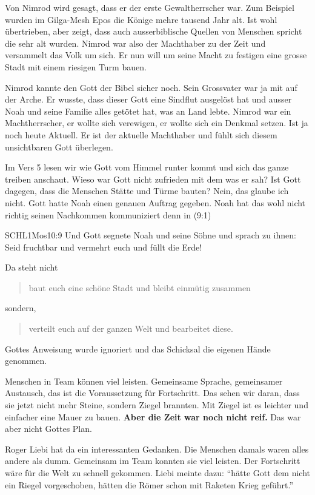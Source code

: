 \documentclass[14pt]{../../inc/mybib}
\newcommand{\q}[1]{\blockquote{#1}}
\newenvironment{block}[1][]{%
  \vspace{1.5em}%
  \noindent\textbf{#1}\par%
  \vspace{0.0em}%
}{%
  \vspace{1em}%
}
\begin{document}
\begin{block}
    Von Nimrod wird gesagt, dass er der erste Gewaltherrscher war. Zum Beispiel wurden im Gilga-Mesh Epos die Könige mehre tausend Jahr alt. Ist wohl übertrieben, aber zeigt, dass auch ausserbiblische Quellen von Menschen spricht die sehr alt wurden. Nimrod war also der Machthaber zu der Zeit und versammelt das Volk um sich. Er nun will um seine Macht zu festigen eine grosse Stadt mit einem riesigen Turm bauen.
\end{block}
\begin{block}
    Nimrod kannte den Gott der Bibel sicher noch. Sein Grossvater war ja mit auf der Arche. Er wusste, dass dieser Gott eine Sindflut ausgelöst hat und ausser Noah und seine Familie alles getötet hat, was an Land lebte. Nimrod war ein Machtherrscher, er wollte sich verewigen, er wollte sich ein Denkmal setzen. Ist ja noch heute Aktuell. Er ist der aktuelle Machthaber und fühlt sich diesem unsichtbaren Gott überlegen.
\end{block}
\begin{block}
    Im Vers 5 lesen wir wie Gott vom Himmel runter kommt und sich das ganze treiben anschaut. Wieso war Gott nicht zufrieden mit dem was er sah? Ist Gott dagegen, dass die Menschen Stätte und Türme bauten? Nein, das glaube ich nicht. Gott hatte Noah einen genauen Auftrag gegeben. Noah hat das wohl nicht richtig seinen Nachkommen kommuniziert denn in (9:1)
    \begin{bibelbox}{SCHL}{1Mos}{10:9}
        Und Gott segnete Noah und seine Söhne und sprach zu ihnen: Seid fruchtbar und vermehrt euch und füllt die Erde!
    \end{bibelbox}    
    
    Da steht nicht \q{baut euch eine schöne Stadt und  bleibt einmütig zusammen} sondern, \q{verteilt euch auf der ganzen Welt und bearbeitet diese.} Gottes Anweisung wurde ignoriert und das Schicksal die eigenen Hände genommen. 
\end{block}
\begin{block}
    Menschen in Team können viel leisten. Gemeinsame Sprache, gemeinsamer Austausch, das ist die Voraussetzung für Fortschritt. Das sehen wir daran, dass sie jetzt nicht mehr Steine, sondern Ziegel brannten. Mit Ziegel ist es leichter und einfacher eine Mauer zu bauen. \textbf{Aber die Zeit war noch nicht reif.} Das war aber nicht Gottes Plan.
\end{block}
\begin{block}
    Roger Liebi hat da ein interessanten Gedanken. Die Menschen damals waren alles andere als dumm. Gemeinsam im Team konnten sie viel leisten. Der Fortschritt wäre für die Welt zu schnell gekommen. Liebi meinte dazu: \enquote{hätte Gott dem nicht ein Riegel vorgeschoben, hätten die Römer schon mit Raketen Krieg geführt.}
\end{block}
\end{document}
